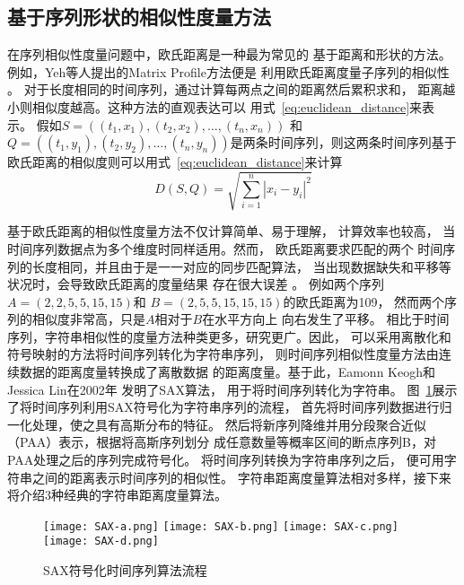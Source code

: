 \subsection{基于序列形状的相似性度量方法}
在序列相似性度量问题中，欧氏距离是一种最为常见的
基于距离和形状的方法。
例如，Yeh等人提出的Matrix Profile方法便是
利用欧氏距离度量子序列的相似性
\cite{DBLP:conf/icdm/YehZUBDDSMK16}。
对于长度相同的时间序列，通过计算每两点之间的距离然后累积求和，
距离越小则相似度越高。这种方法的直观表达可以
用式~\ref{eq:euclidean_distance}来表示。
假如$S=\left(\left(t_1,x_1 \right),\left(t_2,x_2\right),\dots,\left(t_n,x_n\right)\right)$
和$Q=\left(\left(t_1,y_1 \right),\left(t_2,y_2\right),\dots,\left(t_n,y_n\right)\right)$是两条时间序列，则这两条时间序列基于欧氏距离的相似度则可以用式~\ref{eq:euclidean_distance}来计算
\begin{equation}
  D\left(S,Q\right) = \sqrt{\sum_{i=1}^{n}{\left| x_{i}-y_{i} \right|^{2}}}
  \label{eq:euclidean_distance}
\end{equation}

基于欧氏距离的相似性度量方法不仅计算简单、易于理解，
计算效率也较高，
当时间序列数据点为多个维度时同样适用。然而，
欧氏距离要求匹配的两个
时间序列的长度相同，并且由于是一一对应的同步匹配算法，
当出现数据缺失和平移等状况时，会导致欧氏距离的度量结果
存在很大误差
\cite{DBLP:journals/pvldb/DingTSWK08}。
例如两个序列$A=\left(2,2,5,5,15,15\right)$和
$B=\left(2,5,5,15,15,15\right)$的欧氏距离为109，
然而两个序列的相似度非常高，只是$A$相对于$B$在水平方向上
向右发生了平移。
相比于时间序列，字符串相似性的度量方法种类更多，研究更广。因此，
可以采用离散化和符号映射的方法将时间序列转化为字符串序列，
则时间序列相似性度量方法由连续数据的距离度量转换成了离散数据
的距离度量。基于此，Eamonn Keogh和Jessica Lin在2002年
发明了SAX算法\cite{DBLP:conf/dmkd/LinKLC03}，
用于将时间序列转化为字符串。
图~\ref{fig:SAX}展示了将时间序列利用SAX符号化为字符串序列的流程，
首先将时间序列数据进行归一化处理，使之具有高斯分布的特征。
然后将新序列降维并用分段聚合近似（PAA）表示，根据将高斯序列划分
成任意数量等概率区间的断点序列B，对PAA处理之后的序列完成符号化。
将时间序列转换为字符串序列之后，
便可用字符串之间的距离表示时间序列的相似性。
字符串距离度量算法相对多样，接下来将介绍3种经典的字符串距离度量算法。
\begin{figure}
  \centering
    {\texttt{[image: SAX-a.png]}}
    {\texttt{[image: SAX-b.png]}}
    {\texttt{[image: SAX-c.png]}}
    {\texttt{[image: SAX-d.png]}}
  \caption{SAX符号化时间序列算法流程}
  \label{fig:SAX}
\end{figure}

